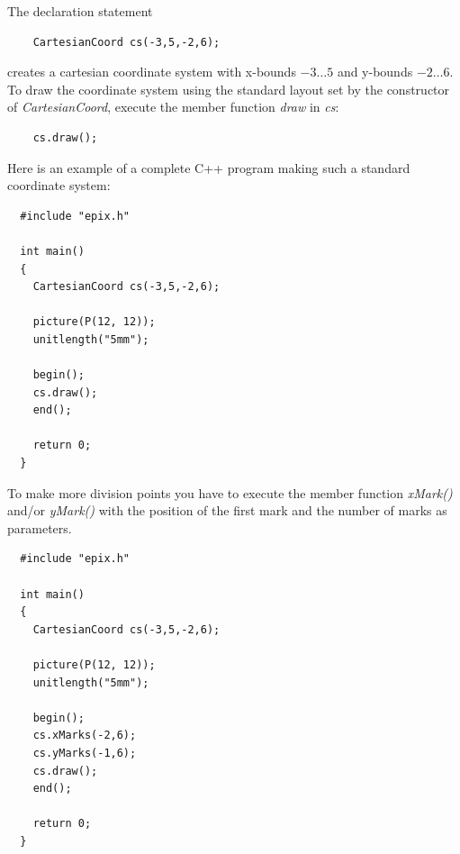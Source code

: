 \documentclass[12pt,a4paper]{article}
\begin{document}
  The declaration statement

  \begin{lstlisting}
    CartesianCoord cs(-3,5,-2,6);
  \end{lstlisting}

  creates a cartesian coordinate system with x-bounds $-3\ldots5$ and
  y-bounds $-2\ldots6$. To draw the coordinate system using the
  standard layout set by the constructor of \textit{CartesianCoord},
  execute the member function \textit{draw} in \textit{cs}:

  \begin{lstlisting}
    cs.draw();
  \end{lstlisting}

  Here is an example of a complete C++ program making such a standard
  coordinate system:

  \begin{minipage}{7.5cm}
    \begin{lstlisting}
  #include "epix.h"

  int main()
  {
    CartesianCoord cs(-3,5,-2,6);

    picture(P(12, 12));
    unitlength("5mm");

    begin();
    cs.draw();
    end();

    return 0;
  }
    \end{lstlisting}
  \end{minipage}
  \begin{minipage}{5.5cm}
    
  \end{minipage}

  To make more division points you have to execute the member function
  \textit{xMark()} and/or \textit{yMark()} with the position of the first
  mark and the number of marks as parameters.

  \begin{minipage}{7.5cm}
    \begin{lstlisting}
  #include "epix.h"

  int main()
  {
    CartesianCoord cs(-3,5,-2,6);

    picture(P(12, 12));
    unitlength("5mm");

    begin();
    cs.xMarks(-2,6);
    cs.yMarks(-1,6);
    cs.draw();
    end();

    return 0;
  }
    \end{lstlisting}
  \end{minipage}
  \begin{minipage}{5.5cm}
      
  \end{minipage}
\end{document}
